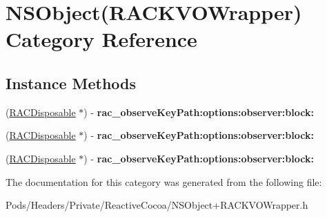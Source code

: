 \hypertarget{category_n_s_object_07_r_a_c_k_v_o_wrapper_08}{}\section{N\+S\+Object(R\+A\+C\+K\+V\+O\+Wrapper) Category Reference}
\label{category_n_s_object_07_r_a_c_k_v_o_wrapper_08}
\subsection*{Instance Methods}
\begin{DoxyCompactItemize}
\item 
\mbox{\label{category_n_s_object_07_r_a_c_k_v_o_wrapper_08_afd369b206bc4c73e823eadd386516cb3}} 
(\mbox{\hyperlink{interface_r_a_c_disposable}{R\+A\+C\+Disposable}} $\ast$) -\/ {\bfseries rac\+\_\+observe\+Key\+Path\+:options\+:observer\+:block\+:}
\item 
\mbox{\label{category_n_s_object_07_r_a_c_k_v_o_wrapper_08_afd369b206bc4c73e823eadd386516cb3}} 
(\mbox{\hyperlink{interface_r_a_c_disposable}{R\+A\+C\+Disposable}} $\ast$) -\/ {\bfseries rac\+\_\+observe\+Key\+Path\+:options\+:observer\+:block\+:}
\item 
\mbox{\label{category_n_s_object_07_r_a_c_k_v_o_wrapper_08_afd369b206bc4c73e823eadd386516cb3}} 
(\mbox{\hyperlink{interface_r_a_c_disposable}{R\+A\+C\+Disposable}} $\ast$) -\/ {\bfseries rac\+\_\+observe\+Key\+Path\+:options\+:observer\+:block\+:}
\end{DoxyCompactItemize}


The documentation for this category was generated from the following file\+:\begin{DoxyCompactItemize}
\item 
Pods/\+Headers/\+Private/\+Reactive\+Cocoa/N\+S\+Object+\+R\+A\+C\+K\+V\+O\+Wrapper.\+h\end{DoxyCompactItemize}
